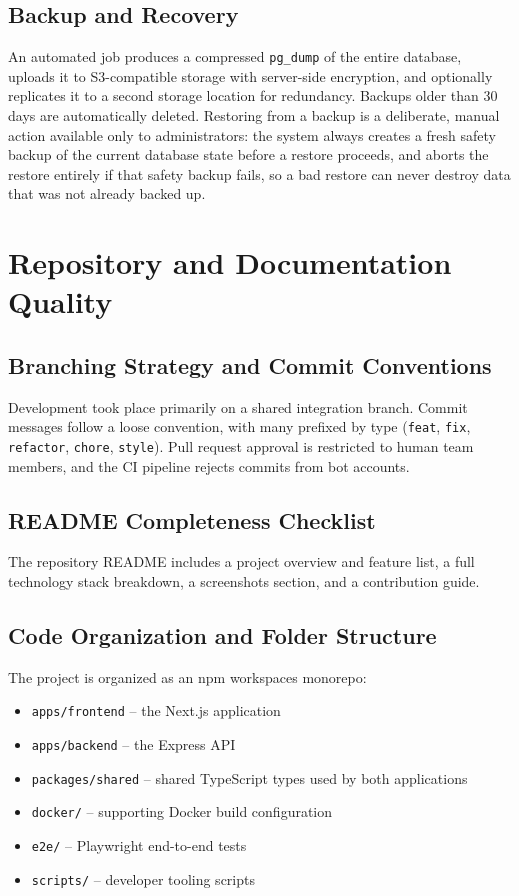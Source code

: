 \documentclass[12pt]{article}
\begin{document}
\subsection{Backup and Recovery}
An automated job produces a compressed \texttt{pg\_dump} of the entire database, uploads it to S3-compatible storage with server-side encryption, and optionally replicates it to a second storage location for redundancy. Backups older than 30 days are automatically deleted. Restoring from a backup is a deliberate, manual action available only to administrators: the system always creates a fresh safety backup of the current database state before a restore proceeds, and aborts the restore entirely if that safety backup fails, so a bad restore can never destroy data that was not already backed up.

\section{Repository and Documentation Quality}

\subsection{Branching Strategy and Commit Conventions}
Development took place primarily on a shared integration branch. Commit messages follow a loose convention, with many prefixed by type (\texttt{feat}, \texttt{fix}, \texttt{refactor}, \texttt{chore}, \texttt{style}). Pull request approval is restricted to human team members, and the CI pipeline rejects commits from bot accounts.

\subsection{README Completeness Checklist}
The repository README includes a project overview and feature list, a full technology stack breakdown, a screenshots section, and a contribution guide.

\subsection{Code Organization and Folder Structure}
The project is organized as an npm workspaces monorepo:
\begin{itemize}[leftmargin=1.4em]
\item \texttt{apps/frontend} -- the Next.js application
\item \texttt{apps/backend} -- the Express API
\item \texttt{packages/shared} -- shared TypeScript types used by both applications
\item \texttt{docker/} -- supporting Docker build configuration
\item \texttt{e2e/} -- Playwright end-to-end tests
\item \texttt{scripts/} -- developer tooling scripts
\end{itemize}
\end{document}
